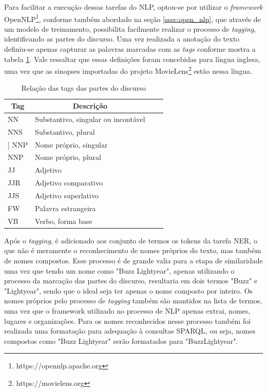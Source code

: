 Para facilitar a execução dessas tarefas do \ac{NLP}, optou-se por utilizar o \textit{framework} OpenNLP\footnote{https://opennlp.apache.org}, conforme também abordado na seção \ref{ssec:open_nlp}, que através de um modelo de treinamento, possibilita facilmente realizar o processo de \textit{tagging}, identificando as partes do discurso. Uma vez realizada a anotação do texto definiu-se apenas capturar as palavras marcadas com as \textit{tags} conforme mostra a tabela \ref{tab:nlp_tags}. Vale ressaltar que essas definições foram concebidas para língua inglesa, uma vez que as sinopses importadas do projeto MovieLens\footnote{https://movielens.org} estão nessa língua.

\begin{table}[H]
	\label{tab:nlp_tags}
	\centering
	\caption{Relação das tags das partes do discurso}
	\def\arraystretch{1.3} %
	\begin{tabular}{| m{1.3cm} | m{9.4cm}| c | m{2cm}}
		\hline
		\multicolumn{1}{|c|}{\bfseries Tag} & \multicolumn{1}{c|}{\bfseries Descrição} \\ \hline
		NN & Substantivo, singular ou incontável \\ \hline 	
		NNS	& Substantivo, plural \\ \hline]
		NNP	& Nome próprio, singular \\ \hline
		NNP	& Nome próprio, plural \\ \hline
		JJ & Adjetivo \\ \hline
		JJR & Adjetivo comparativo \\ \hline
		JJS & Adjetivo superlativo \\ \hline
		FW & Palavra estrangeira \\ \hline
		VB & Verbo, forma base \\ \hline
	\end{tabular}
\end{table}

Após o \textit{tagging}, é adicionado aos conjunto de termos os tokens da tarefa \ac{NER}, o que não é meramente o reconhecimento de nomes próprios do texto, mas também de nomes compostos. Esse processo é de grande valia para a etapa de similaridade uma vez que tendo um nome como "Buzz Lightyear", apenas utilizando o processo da marcação das partes do discurso, resultaria em dois termos "Buzz" e "Lightyear", sendo que o ideal seja ter apenas o nome composto por inteiro. Os nomes próprios pelo processo de \textit{tagging} também são mantidos na lista de termos, uma vez que o framework utilizado no processo de \ac{NLP} apenas extrai, nomes, lugares e organizações. Para os nomes reconhecidos nesse processo também foi realizada uma formatação para adequação à consultas \ac{SPARQL}, ou seja, nomes compostos como "Buzz Lightyear" serão formatados para "Buzz\textunderscore Lightyear".

